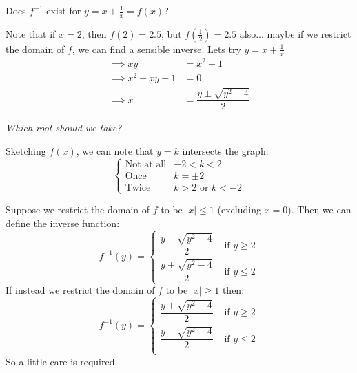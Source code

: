 \documentclass[twoside]{scrartcl}
\begin{document}
\begin{example} Does $f^{-1}$ exist for $y = x + \frac{1}{x} = f(x)$?

Note that if $x = 2$, then $f(2) = 2.5$, but $f(\frac{1}{2}) = 2.5$ also...
maybe if we restrict the domain of $f$, we can find a sensible inverse. Lets try $y = x + \frac{1}{x}$
\[
\begin{aligned}
  \implies xy &= x^2 + 1\\
  \implies x^2 - xy + 1 &= 0\\
  \implies x &= \dfrac{y \pm \sqrt{y^2 -4}}{2}
\end{aligned}
\]


\emph{Which root should we take?}

Sketching $f(x)$, we can note that $y = k$ intersects the graph: 
\[\begin{cases}
\text{Not at all}& -2 < k< 2\\
\text{Once} & k = \pm 2\\
\text{Twice} & k>2 \text{ or } k<-2
\end{cases}\]



\begin{center}
\end{center}



\vspace{5pt}

Suppose we restrict the domain of $f$ to be $|x| \leq 1$ (excluding $x=0$). Then we can define the inverse function:
\[f^{-1}(y) = 
\begin{cases}
 \dfrac{y - \sqrt{y^2 -4}}{2} & \text{ if } y \geq 2 \\[0.3cm]
 \dfrac{y + \sqrt{y^2 -4}}{2} & \text{ if } y \leq 2 
 \end{cases}
 \]
If instead we restrict the domain of $f$ to be $|x| \geq 1$ then:
\[f^{-1}(y) = \begin{cases}
 \dfrac{y + \sqrt{y^2 -4}}{2} & \text{ if } y \geq 2 \\[0.3cm]
 \dfrac{y - \sqrt{y^2 -4}}{2} & \text{ if } y \leq 2 \\
 \end{cases}
 \]
So a little care is required.
\end{example}
\end{document}
